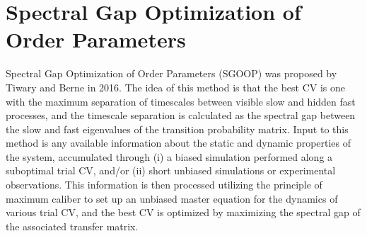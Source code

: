 \section{Spectral Gap Optimization of Order Parameters\label{Sec:DR:SGOOP}}
Spectral Gap Optimization of Order Parameters (SGOOP) was proposed by Tiwary and Berne in 2016.\cite{TiwaryPNAS2016} The idea of this method is that the best CV is one with the maximum separation of timescales between visible slow and hidden fast processes, and the timescale separation is calculated as the spectral gap between the slow and fast eigenvalues of the transition probability matrix. Input to this method is any available information about the static and dynamic properties of the system, accumulated through (i) a biased simulation performed along a suboptimal trial CV, and/or (ii) short unbiased simulations or experimental observations. This information is then processed utilizing the principle of maximum caliber to set up an unbiased master equation for the dynamics of various trial CV, and the best CV is optimized by maximizing the spectral gap of the associated transfer matrix.

